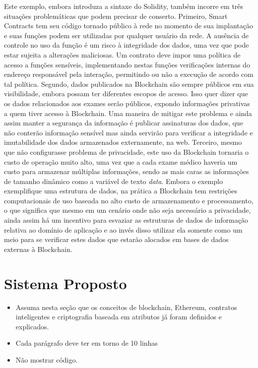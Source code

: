\documentclass[a4paper,11pt]{article}
\begin{document}
Este exemplo, embora introduza a sintaxe do Solidity, também incorre em três situações problemáticas que podem precisar de conserto. Primeiro, Smart Contracts tem seu código tornado público à rede no momento de sua implantação e suas funções podem ser utilizadas por qualquer usuário da rede. A ausência de controle no uso da função é um risco à integridade dos dados, uma vez que pode estar sujeita a alterações maliciosas. Um contrato deve impor uma política de acesso a funções sensíveis, implementando nestas funções verificações internas do endereço responsável pela interação, permitindo ou não a execução de acordo com tal política. Segundo, dados publicados na Blockchain são sempre públicos em sua visibilidade, embora possam ter diferentes escopos de acesso. Isso quer dizer que os dados relacionados aos exames serão públicos, expondo informações privativas a quem tiver acesso à Blockchain. Uma maneira de mitigar este problema e ainda assim manter a segurança da informação é publicar assinaturas dos dados, que não conterão informação sensível mas ainda servirão para verificar a integridade e imutabilidade dos dados armazenados externamente, na web. Terceiro, mesmo que não configurasse problema de privacidade, este uso da Blockchain tornaria o custo de operação muito alto, uma vez que a cada exame médico haveria um custo para armazenar múltiplas informações, sendo as mais caras as informações de tamanho dinâmico como a variável de texto \emph{data}. Embora o exemplo exemplifique uma estrutura de dados, na prática a Blockchain tem restrições computacionais de uso baseada no alto custo de armazenamento e processamento, o que significa que mesmo em um cenário onde não seja necessário a privacidade, ainda assim há um incentivo para esvaziar as estruturas de dados de informação relativa ao domínio de aplicação e ao invés disso utilizar ela somente como um meio para se verificar estes dados que estarão alocados em bases de dados externas à Blockchain.

\newpage
\section{Sistema Proposto}

\begin{itemize}
    \item {\color{red} Assuma nesta seção que os conceitos de blockchain, Ethereum, contratos inteligentes e criptografia baseada em atributos já foram definidos e explicados.}

    \item {\color{red}Cada parágrafo deve ter em torno de 10 linhas}

    \item {\color{red}Não mostrar código.}

\end{itemize}
\end{document}
